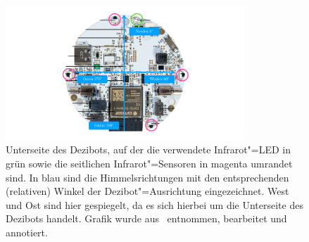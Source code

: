 \begin{figure}[h]
    \centering
    \includegraphics[width=0.8\textwidth]{../assets/dezibot_bottom.pdf}
    \caption{Unterseite des Dezibots, auf der die verwendete Infrarot"=LED in grün sowie die seitlichen Infrarot"=Sensoren in magenta umrandet sind. In blau sind die Himmelsrichtungen mit den entsprechenden (relativen) Winkel der Dezibot"=Ausrichtung eingezeichnet. West und Ost sind hier gespiegelt, da es sich hierbei um die Unterseite des Dezibots handelt. Grafik wurde aus~\cite{fingerleDokumentationDezibot42025} entnommen, bearbeitet und annotiert.}
    \label{fig:dezibot-bottom}
\end{figure}

